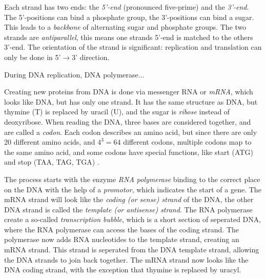 \documentclass[../main/thesis.tex]{subfiles}
\begin{document}

Each strand has two ends: the \textit{5'-end} (pronounced five-prime) and the \textit{3'-end}.
The 5'-positions can bind a phosphate group, the 3'-positions can bind a sugar.
This leads to a \textit{backbone} of alternating sugar and phosphate groups.
The two strands are \textit{antiparallel}, this means one strands 5'-end is matched to the others 3'-end.
The orientation of the strand is significant: replication and translation can only be done in 5'$\rightarrow$3' direction.


During DNA replication, DNA polymerase...


Creating new proteins from DNA is done via messenger RNA or \textit{mRNA}, which looks like DNA, but has only one strand.
It has the same structure as DNA, but thymine (T) is replaced by uracil (U), and the sugar is \textit{ribose} instead of deoxyribose.
When reading the DNA, three bases are considered together, and are called a \textit{codon}.
Each codon describes an amino acid, but since there are only 20 different amino acids, and $4^3=64$ different codons, multiple codons map to the same amino acid, and some codons have special functions, like start (ATG) and stop (TAA, TAG, TGA) \cite{codons}.

The process starts with the enzyme \textit{RNA polymerase} binding to the correct place on the DNA with the help of a \textit{promotor}, which indicates the start of a gene.
The mRNA strand will look like the \textit{coding (or sense) strand} of the DNA, the other DNA strand is called the \textit{template (or antisense) strand}.
The RNA polymerase create a so-called \textit{transcription bubble}, which is a short section of seperated DNA, where the RNA polymerase can access the bases of the coding strand.
The polymerase now adds RNA nucleotides to the template strand, creating an mRNA strand.
This strand is seperated from the DNA template strand, allowing the DNA strands to join back together.
The mRNA strand now looks like the DNA coding strand, with the exception that thymine is replaced by uracyl.
\end{document}
